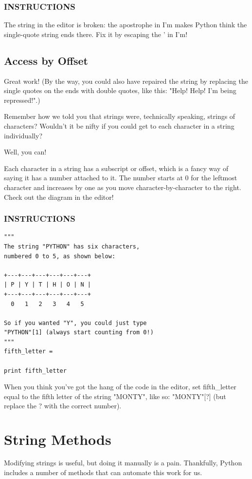 \documentclass[12pt,a4paper,final,twoside,onecolumn,titlepage]{book}
\begin{document}
\subsubsection{INSTRUCTIONS}
The string in the editor is broken: the apostrophe in I'm makes Python think the single-quote string ends there. Fix it by escaping the ' in I'm!


\subsection{Access by Offset}
Great work! (By the way, you could also have repaired the string by replacing the single quotes on the ends with double quotes, like this: "Help! Help! I'm being repressed!".)

Remember how we told you that strings were, technically speaking, strings of characters? Wouldn't it be nifty if you could get to each character in a string individually?

Well, you can!

Each character in a string has a subscript or offset, which is a fancy way of saying it has a number attached to it. The number starts at 0 for the leftmost character and increases by one as you move character-by-character to the right. Check out the diagram in the editor!

\subsubsection{INSTRUCTIONS}
\begin{lstlisting}
"""
The string "PYTHON" has six characters,
numbered 0 to 5, as shown below:

+---+---+---+---+---+---+
| P | Y | T | H | O | N |
+---+---+---+---+---+---+
  0   1   2   3   4   5

So if you wanted "Y", you could just type
"PYTHON"[1] (always start counting from 0!)
"""
fifth_letter = 

print fifth_letter
\end{lstlisting}

When you think you've got the hang of the code in the editor, set fifth\_letter equal to the fifth letter of the string "MONTY", like so: "MONTY"[?] (but replace the ? with the correct number).

\section{String Methods}
Modifying strings is useful, but doing it manually is a pain. Thankfully, Python includes a number of methods that can automate this work for us.
\end{document}
